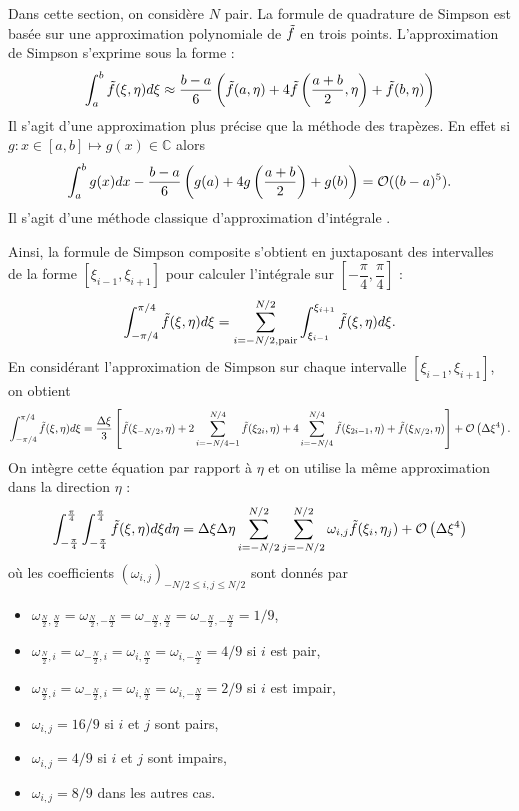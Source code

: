 Dans cette section, on considère $N$ pair.
La formule de quadrature de Simpson est basée sur une approximation polynomiale de $\tilde{f}$ en trois points. L'approximation de Simpson s'exprime sous la forme :
\begin{equation}
\displaystyle\int_a^b \tilde{f}(\xi, \eta) d\xi \approx \dfrac{b-a}{6} \left( \tilde{f}(a,\eta) + 4  \tilde{f} \left( \dfrac{a+b}{2},\eta \right) + \tilde{f}(b,\eta) \right) 
\end{equation}
Il s'agit d'une approximation plus précise que la méthode des trapèzes. En effet si $g : x \in [a,b] \mapsto g(x) \in \mathbb{C}$ alors
\begin{equation}
\displaystyle\int_a^b g(x)dx - \dfrac{b-a}{6} \left( g(a) + 4 g\left( \dfrac{a+b}{2} \right) + g(b) \right) = \mathcal{O}((b-a)^5).
\end{equation}
Il s'agit d'une méthode classique d'approximation d'intégrale \cite{Hammerlin1991}.

Ainsi, la formule de Simpson composite s'obtient en juxtaposant des intervalles de la forme $\left[ \xi_{i-1}, \xi_{i+1} \right]$ pour calculer l'intégrale sur $\left[ -\dfrac{\pi}{4} , \dfrac{\pi}{4} \right]$ :
\begin{equation}
\displaystyle\int_{- \pi/4}^{\pi/4} \tilde{f}(\xi, \eta) d\xi = \displaystyle\sum\limits_{i=-N/2, \text{pair}}^{N/2} \displaystyle\int_{\xi_{i-1}}^{\xi_{i+1}} \tilde{f}(\xi, \eta) d\xi.
\end{equation}
En considérant l'approximation de Simpson sur chaque intervalle $\left[ \xi_{i-1}, \xi_{i+1} \right]$, on obtient
\begin{equation}
\displaystyle\int_{-\pi/4}^{\pi/4} \tilde{f}(\xi, \eta) d\xi = \dfrac{\Delta \xi}{3} \left[ \tilde{f}(\xi_{-N/2}, \eta) + 2 \displaystyle\sum\limits_{i=-N/4-1}^{N/4} \tilde{f}(\xi_{2i}, \eta)  + 4 \displaystyle\sum\limits_{i=-N/4}^{N/4} \tilde{f}(\xi_{2i-1}, \eta) + \tilde{f}(\xi_{N/2}, \eta) \right] + \mathcal{O}\left( \Delta \xi^4\right).
\end{equation}
On intègre cette équation par rapport à $\eta$ et on utilise la même approximation dans la direction $\eta$ :
\begin{equation}
\displaystyle\int_{-\frac{\pi}{4}}^{\frac{\pi}{4}} \displaystyle\int_{-\frac{\pi}{4}}^{\frac{\pi}{4}} \tilde{f}(\xi, \eta) d\xi  d\eta= \Delta\xi \Delta \eta \displaystyle\sum\limits_{i=-N/2}^{N/2}\displaystyle\sum\limits_{j=-N/2}^{N/2} \omega_{i,j} \tilde{f}(\xi_i, \eta_j) + \mathcal{O}\left( \Delta \xi^4\right)
\label{eq:simpson 2d}
\end{equation}
où les coefficients $(\omega_{i,j})_{-N/2 \leq i,j \leq N/2}$ sont donnés par
\begin{itemize}
\item $\omega_{\frac{N}{2},\frac{N}{2}}=\omega_{\frac{N}{2},-\frac{N}{2}}=\omega_{-\frac{N}{2},\frac{N}{2}}=\omega_{-\frac{N}{2},-\frac{N}{2}}=1/9$,
\item $\omega_{\frac{N}{2},i}=\omega_{-\frac{N}{2},i}=\omega_{i,\frac{N}{2}}=\omega_{i,-\frac{N}{2}}=4/9$ si $i$ est pair,
\item $\omega_{\frac{N}{2},i}=\omega_{-\frac{N}{2},i}=\omega_{i,\frac{N}{2}}=\omega_{i,-\frac{N}{2}}=2/9$ si $i$ est impair,
\item $\omega_{i,j}=16/9$ si $i$ et $j$ sont pairs,
\item $\omega_{i,j}=4/9$ si $i$ et $j$ sont impairs,
\item $\omega_{i,j}=8/9$ dans les autres cas.
\end{itemize}

